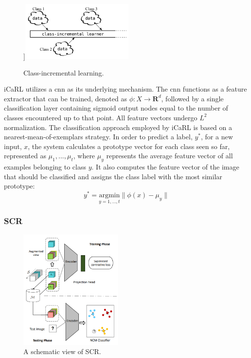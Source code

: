 \begin{figure}[H]
    \centering
    \textwidth\textwidth]\includegraphics[width=0.5\textwidth]{Images//class_incremental_learning.png}
    \caption{Class-incremental learning. \citep{rebuffi2017icarl}}
    \label{fig:icarl}
\end{figure}

iCaRL utilizes a \acrshort{cnn} as its underlying mechanism. The \acrshort{cnn} functions as a feature extractor that can be trained, denoted as $\phi: X \rightarrow \mathbf{R}^{d}$, followed by a single classification layer containing sigmoid output nodes equal to the number of classes encountered up to that point. All feature vectors undergo $L^{2}$ normalization. The classification approach employed by iCaRL is based on a nearest-mean-of-exemplars strategy. In order to predict a label, $y^{*}$, for a new input, $x$, the system calculates a prototype vector for each class seen so far, represented as $\mu_{1}, ..., \mu_{t}$, where $\mu_{y}$ represents the average feature vector of all examples belonging to class $y$. It also computes the feature vector of the image that should be classified and assigns the class label with the most similar prototype: 
\[
y^{*} = \underset{y=1,...,t}{\mathrm{argmin }} \| \phi(x) - \mu_{y} \|
\]

\subsubsection{SCR}
\label{sec:SCR}
\begin{figure}
    \includegraphics[width=0.46\textwidth]{Images/scr_architecture.png}
    \caption{A schematic view of SCR. \citep{mai2021supervised}}
    \label{fig:scr_architecture}
\end{figure}

